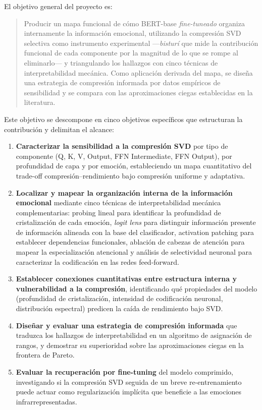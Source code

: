El objetivo general del proyecto es:

\begin{quote}
    Producir un mapa funcional de cómo BERT-base \emph{fine-tuneado}
    organiza internamente la información emocional, utilizando la
    compresión SVD selectiva como instrumento experimental
    ---\emph{bisturí} que mide la contribución funcional de cada
    componente por la magnitud de lo que se rompe al eliminarlo--- y
    triangulando los hallazgos con cinco técnicas de interpretabilidad
    mecánica. Como aplicación derivada del mapa, se diseña una
    estrategia de compresión informada por datos empíricos de
    sensibilidad y se compara con las aproximaciones ciegas
    establecidas en la literatura.
\end{quote}

Este objetivo se descompone en cinco objetivos específicos que estructuran la
contribución y delimitan el alcance:

\begin{enumerate}[nosep, label=\textbf{O\arabic*.}]
    \item \textbf{Caracterizar la sensibilidad a la compresión SVD} por tipo de
    componente (Q, K, V, Output, FFN Intermediate, FFN Output), por profundidad
    de capa y por emoción, estableciendo un mapa cuantitativo del trade-off
    compresión--rendimiento bajo compresión uniforme y adaptativa.

    \item \textbf{Localizar y mapear la organización interna de la información
    emocional} mediante cinco técnicas de interpretabilidad mecánica
    complementarias: probing lineal para identificar la profundidad de
    cristalización de cada emoción, \emph{logit lens} para distinguir información
    presente de información alineada con la base del clasificador, activation
    patching para establecer dependencias funcionales, ablación de cabezas de
    atención para mapear la especialización atencional y análisis de selectividad
    neuronal para caracterizar la codificación en las redes feed-forward.

    \item \textbf{Establecer conexiones cuantitativas entre estructura interna y
    vulnerabilidad a la compresión}, identificando qué propiedades del modelo
    (profundidad de cristalización, intensidad de codificación neuronal,
    distribución espectral) predicen la caída de rendimiento bajo SVD.

    \item \textbf{Diseñar y evaluar una estrategia de compresión informada} que
    traduzca los hallazgos de interpretabilidad en un algoritmo de asignación de
    rangos, y demostrar su superioridad sobre las aproximaciones ciegas en la
    frontera de Pareto.

    \item \textbf{Evaluar la recuperación por fine-tuning} del modelo
    comprimido, investigando si la compresión SVD seguida de un breve
    re-entrenamiento puede actuar como regularización implícita que beneficie
    a las emociones infrarrepresentadas.
\end{enumerate}



